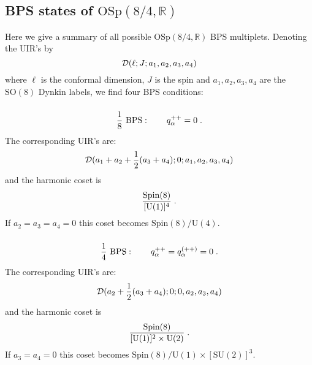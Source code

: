\documentclass[a4paper,12pt]{article}
\begin{document}
\subsection{BPS states of $\mbox{OSp}(8/4,\mathbb{R})$}

Here we give a summary of all possible 
$\mbox{OSp}(8/4,\mathbb{R})$ BPS multiplets. Denoting the UIR's by 
\begin{equation}\label{7.39}
  {\cal D}(\ell;J;a_1,a_2,a_3,a_4)
\end{equation}
where $\ell$ is the conformal dimension, $J$ is the spin and 
$a_1,a_2,a_3,a_4$ are the $\mbox{SO}(8)$ Dynkin labels, we find 
four BPS conditions: 

\subsubsection{} 

\begin{equation}\label{8.14}
  {1\over 8}\ \mbox{BPS}:\qquad  q_\alpha^{++} =0\;.  
\end{equation}
The corresponding UIR's are: 
\begin{equation}\label{8.15}
  {\cal D}(a_1+a_2 + {1\over 2}(a_3+a_4);0;a_1,a_2,a_3,a_4)
\end{equation}
and the harmonic coset is 
\begin{equation}\label{8.16}
  {\mbox{Spin}(8)\over [\mbox{U}(1)]^4}\;.
\end{equation}
If $a_2=a_3=a_4=0$ this coset becomes 
$\mbox{Spin}(8)/\mbox{U}(4)$. 

\subsubsection{} 

\begin{equation}\label{8.17}
  {1\over 4}\ \mbox{BPS}:\qquad  q_\alpha^{++} =q_\alpha^{(++)} =0\;.  
\end{equation}
The corresponding UIR's are: 
\begin{equation}\label{8.18}
  {\cal D}(a_2 + {1\over 2}(a_3+a_4);0;0,a_2,a_3,a_4)
\end{equation}
and the harmonic coset is 
\begin{equation}\label{8.19}
  {\mbox{Spin}(8)\over [\mbox{U}(1)]^2\times \mbox{U}(2)}\;.
\end{equation}
If $a_3=a_4=0$ this coset becomes 
$\mbox{Spin}(8)/\mbox{U}(1)\times [\mbox{SU}(2)]^3$. 

\subsubsection{} 
\end{document}
